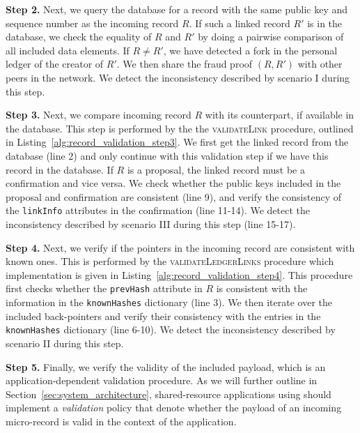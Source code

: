 \textbf{Step 2.}
Next, we query the database for a record with the same public key and sequence number as the incoming record $ R $.
If such a linked record $ R' $ is in the database, we check the equality of $ R $ and $ R' $ by doing a pairwise comparison of all included data elements.
If $ R \not= R' $, we have detected a fork in the personal ledger of the creator of $ R' $.
We then share the fraud proof $ (R, R') $ with other peers in the network.
We detect the inconsistency described by scenario I during this step.

\textbf{Step 3.}
Next, we compare incoming record $ R $ with its counterpart, if available in the database.
This step is performed by the the \textsc{validateLink} procedure, outlined in Listing~\ref{alg:record_validation_step3}.
We first get the linked record from the database (line 2) and only continue with this validation step if we have this record in the database.
If $ R $ is a proposal, the linked record must be a confirmation and vice versa.
We check whether the public keys included in the proposal and confirmation are consistent (line 9), and verify the consistency of the \texttt{linkInfo} attributes in the confirmation (line 11-14).
We detect the inconsistency described by scenario III during this step (line 15-17).

\textbf{Step 4.}
Next, we verify if the pointers in the incoming record are consistent with known ones.
This is performed by the \textsc{validateLedgerLinks} procedure which implementation is given in Listing~\ref{alg:record_validation_step4}.
This procedure first checks whether the \texttt{prevHash} attribute in $ R $ is consistent with the information in the \texttt{knownHashes} dictionary (line 3).
We then iterate over the included back-pointers and verify their consistency with the entries in the \texttt{knownHashes} dictionary (line 6-10).
We detect the inconsistency described by scenario II during this step.

\textbf{Step 5.}
Finally, we verify the validity of the included payload, which is an application-dependent validation procedure.
As we will further outline in Section~\ref{sec:system_architecture}, shared-resource applications using \ModelName{} should implement a \emph{validation} policy that denote whether the payload of an incoming micro-record is valid in the context of the application.

